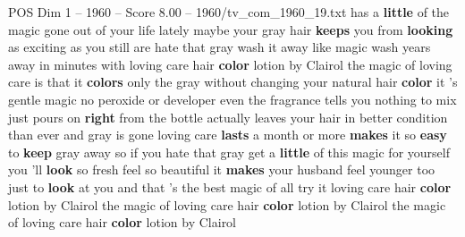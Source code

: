 \begin{textsample}{POS Dim 1 – 1960 – Score 8.00 – 1960/tv\_com\_1960\_19.txt}  \label{ex:f1_pos_026}
has a \textbf{little} of the magic gone out of your life lately maybe your gray hair \textbf{keeps} you from \textbf{looking} as exciting as you still are hate that gray wash it away like magic wash years away in minutes with loving care hair \textbf{color} lotion by Clairol the magic of loving care is that it \textbf{colors} only the gray without changing your natural hair \textbf{color} it 's gentle magic no peroxide or developer even the fragrance tells you nothing to mix just pours on \textbf{right} from the bottle actually leaves your hair in better condition than ever and gray is gone loving care \textbf{lasts} a month or more \textbf{makes} it so \textbf{easy} to \textbf{keep} gray away so if you hate that gray get a \textbf{little} of this magic for yourself you 'll \textbf{look} so fresh feel so beautiful it \textbf{makes} your husband feel younger too just to \textbf{look} at you and that 's the best magic of all try it loving care hair \textbf{color} lotion by Clairol the magic of loving care hair \textbf{color} lotion by Clairol the magic of loving care hair \textbf{color} lotion by Clairol

\end{textsample}
